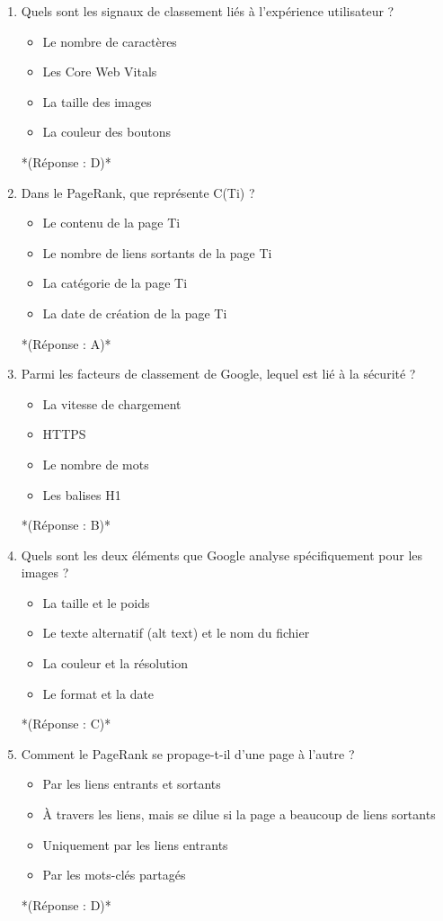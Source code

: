 \documentclass[12pt,a4paper,twoside]{report}
\begin{document}
\begin{enumerate}
\item Quels sont les signaux de classement liés à l'expérience utilisateur ?
\begin{itemize}
\item[A)] Le nombre de caractères
\item[B)] Les Core Web Vitals
\item[C)] La taille des images
\item[D)] La couleur des boutons
\end{itemize}
*(Réponse : D)*

\item Dans le PageRank, que représente C(Ti) ?
\begin{itemize}
\item[A)] Le contenu de la page Ti
\item[B)] Le nombre de liens sortants de la page Ti
\item[C)] La catégorie de la page Ti
\item[D)] La date de création de la page Ti
\end{itemize}
*(Réponse : A)*

\item Parmi les facteurs de classement de Google, lequel est lié à la sécurité ?
\begin{itemize}
\item[A)] La vitesse de chargement
\item[B)] HTTPS
\item[C)] Le nombre de mots
\item[D)] Les balises H1
\end{itemize}
*(Réponse : B)*

\item Quels sont les deux éléments que Google analyse spécifiquement pour les images ?
\begin{itemize}
\item[A)] La taille et le poids
\item[B)] Le texte alternatif (alt text) et le nom du fichier
\item[C)] La couleur et la résolution
\item[D)] Le format et la date
\end{itemize}
*(Réponse : C)*

\item Comment le PageRank se propage-t-il d'une page à l'autre ?
\begin{itemize}
\item[A)] Par les liens entrants et sortants
\item[B)] À travers les liens, mais se dilue si la page a beaucoup de liens sortants
\item[C)] Uniquement par les liens entrants
\item[D)] Par les mots-clés partagés
\end{itemize}
*(Réponse : D)*


\end{enumerate}
\end{document}

